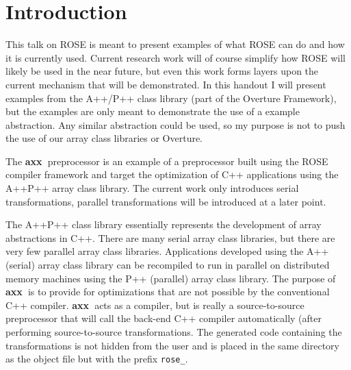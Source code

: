 \documentclass[10pt]{article}
\newcommand{\axx}{{\bf axx\ }}
\begin{document}
\section{Introduction}

   This talk on ROSE is meant to present examples of what ROSE can do and how it is currently used.
Current research work will of course simplify how ROSE will likely be used in the near future, but
even this work forms layers upon the current mechanism that will be demonstrated.  In this handout
I will present examples from the A++/P++ class library (part of the Overture Framework), but the examples
are only meant to demonstrate the use of a example abstraction.  Any similar abstraction could be
used, so my purpose is not to push the use of our array class libraries or Overture.

    The \axx preprocessor is an example of a preprocessor built using the ROSE compiler framework
and target the optimization of C++ applications using the A++\/P++ array class library.  The current
work only introduces serial transformations, parallel transformations will be introduced at a later
point.

    The A++\/P++ class library essentially represents the development of array abstractions in C++.
There are many serial array class libraries, but there are very few parallel array class libraries.
Applications developed using the A++ (serial) array class library can be recompiled to run in parallel
on distributed memory machines using the P++ (parallel) array class library.  The purpose of \axx is to
provide for optimizations that are not possible by the conventional C++ compiler.  \axx acts as a compiler,
but is really a source-to-source preprocessor that will call the back-end C++ compiler automatically (after
performing source-to-source transformations.  The generated code containing the transformations is not hidden
from the user and is placed in the same directory as the object file but with the prefix {\tt rose\_}.

\vspace{0.5in}
\end{document}
